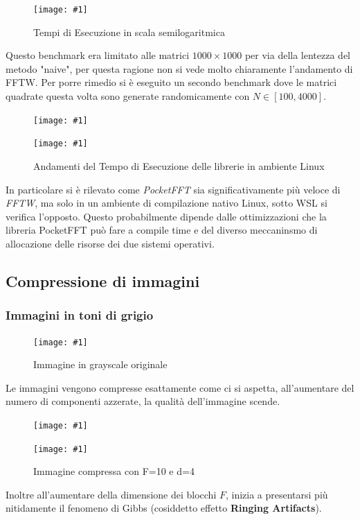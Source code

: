 \documentclass[a4paper,11pt,oneside, table]{article}
\newcommand{\putimage}[4] {
	\begin{figure}[H]
	    \centering
	    \texttt{[image: \#1]}
	    \caption{#2}\label{#3}
	\end{figure}
}
\newcommand{\putsubimage}[5] {
  \begin{minipage}{{#4}\linewidth}
	    \centering
      \texttt{[image: \#1]}
	    \caption{#2}\label{#3}
	\end{minipage}
}
\newcommand{\putimagecouple}[2] {
  \begin{figure}[!htb]
      \centering
      #1
      \hspace{0.5cm}
      #2
  \end{figure}
}
\begin{document}
\putimage{images/actuator-trends.png}{Tempi di Esecuzione in scala semilogaritmica}{png:actuator-trends}{0.99}

Questo benchmark era limitato alle matrici $1000 \times 1000$ per via della lentezza del metodo "naive", per questa ragione non si vede molto chiaramente l'andamento di FFTW.
Per porre rimedio si \`e eseguito un secondo benchmark dove le matrici quadrate questa volta sono generate randomicamente con $N \in [100, 4000]$.

\putimagecouple
  {\putsubimage{./images/benchmark-libraries-wsl.png}{Andamenti del Tempo di Esecuzione delle librerie in ambiente WSL}{png:benchmark-libraries-wsl}{0.45}{0.99}}
  {\putsubimage{./images/benchmark-libraries-linux.png}{Andamenti del Tempo di Esecuzione delle librerie in ambiente Linux}{png:benchmark-libraries-linux}{0.45}{0.99}}

In particolare si \`e rilevato come \textit{PocketFFT} sia significativamente pi\`u veloce di \textit{FFTW}, ma solo in un ambiente di compilazione nativo Linux, sotto WSL si verifica l'opposto.
Questo probabilmente dipende dalle ottimizzazioni che la libreria PocketFFT pu\`o fare a compile time e del diverso meccaninsmo di allocazione delle risorse dei due sistemi operativi.
\subsection{Compressione di immagini}

\subsubsection{Immagini in toni di grigio}

\putimage{./images/compression-gs-original.png}{Immagine in grayscale originale}{png:compression-gs-original}{0.45}

Le immagini vengono compresse esattamente come ci si aspetta, all'aumentare del numero di componenti azzerate, la qualit\`a dell'immagine scende.

\putimagecouple
  {\putsubimage{./images/compression-gs-F10-d16.png}{Immagine compressa con F=10 e d=16}{png:compression-gs-F10-d16}{0.45}{0.99}}
  {\putsubimage{./images/compression-gs-F10-d4.png}{Immagine compressa con F=10 e d=4}{png:compression-gs-F10-d4}{0.45}{0.99}}

Inoltre all'aumentare della dimensione dei blocchi $F$, inizia a presentarsi pi\`u nitidamente il fenomeno di Gibbs (cosiddetto effetto \textbf{Ringing Artifacts}).
\end{document}
